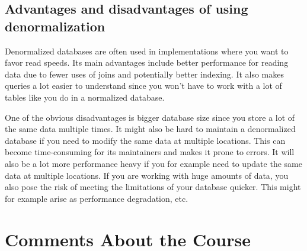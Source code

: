 \documentclass[a4paper]{scrartcl}
\begin{document}
\subsection{Advantages and disadvantages of using denormalization}
Denormalized databases are often used in implementations where you want to favor read speeds. Its main advantages include better performance for reading data due to fewer uses of joins and potentially better indexing. It also makes queries a lot easier to understand since you won't have to work with a lot of tables like you do in a normalized database.

One of the obvious disadvantages is bigger database size since you store a lot of the same data multiple times. It might also be hard to maintain a denormalized database if you need to modify the same data at multiple locations. This can become time-consuming for its maintainers and makes it prone to errors. It will also be a lot more performance heavy if you for example need to update the same data at multiple locations. If you are working with huge amounts of data, you also pose the risk of meeting the limitations of your database quicker. This might for example arise as performance degradation, etc.

\section{Comments About the Course}
\end{document}
